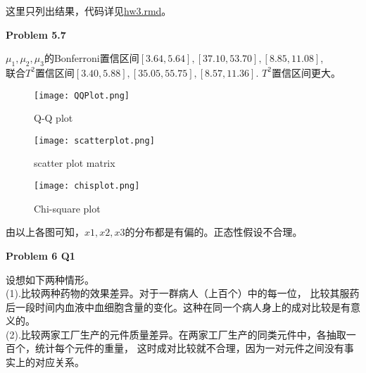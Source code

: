 \documentclass[UTF8,12pt]{article}
\newenvironment{problem}[2][Problem]
{ \begin{mdframed}[backgroundcolor=gray!20] \textbf{#1 #2}}
	{  \end{mdframed}}
\newenvironment{answer}
{%
}
{}
\begin{document}
\renewcommand{\qed}{\quad\qedsymbol}

这里只列出结果，代码详见\href{.\\hm3.rmd}{hw3.rmd}。

\begin{problem}{5.7}
\end{problem}
\begin{answer}
	$\mu_1,\mu_2,\mu_3$的Bonferroni置信区间$[3.64,5.64],
	[37.10,53.70],[8.85,11.08]$,\\
	联合$T^2$置信区间$[3.40,5.88],[35.05,55.75],[8.57,11.36]$. $T^2$置信区间更大。
	\begin{figure}[H]
		\centering
		\texttt{[image: QQPlot.png]}
		\caption{Q-Q plot}
	\end{figure}

	\begin{figure}[H]
		\centering
		\texttt{[image: scatterplot.png]}
		\caption{scatter plot matrix}
	\end{figure}

	\begin{figure}[H]
		\centering
		\texttt{[image: chisplot.png]}
		\caption{Chi-square plot}
	\end{figure}

	由以上各图可知，$x1,x2,x3$的分布都是有偏的。正态性假设不合理。
\end{answer}

\begin{problem}{6 Q1}
\end{problem}
\begin{answer}
	设想如下两种情形。\\
	(1).比较两种药物的效果差异。对于一群病人（上百个）中的每一位，
	比较其服药后一段时间内血液中血细胞含量的变化。这种在同一个病人身上的成对比较是有意义的。\\
	(2).比较两家工厂生产的元件质量差异。在两家工厂生产的同类元件中，各抽取一百个，统计每个元件的重量，
	这时成对比较就不合理，因为一对元件之间没有事实上的对应关系。
\end{answer}
\end{document}

